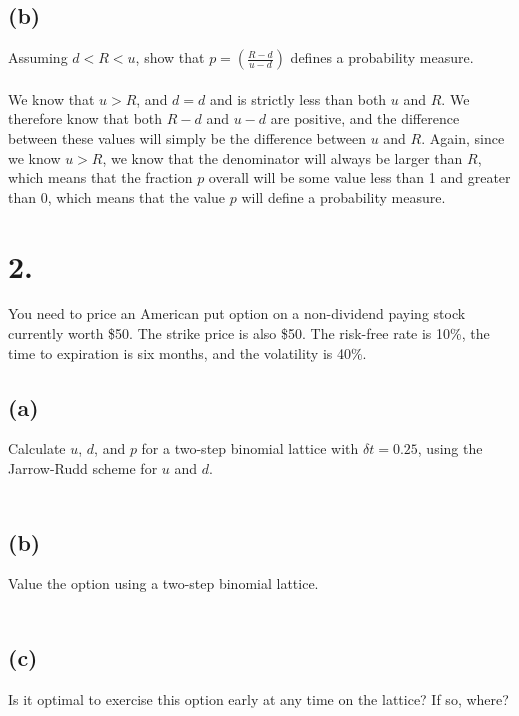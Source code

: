 \documentclass{article}
\begin{document}
{\subsection*{(b)}

Assuming $d < R < u$, show that $p = (\frac{R - d}{u - d})$ defines a probability measure. \\ \\

We know that $u > R$, and $d = d$ and is strictly less than both $u$ and $R$. We therefore know that both $R-d$ and $u-d$ are positive, and the difference between these values will simply be the difference between $u$ and $R$. Again, since we know $u > R$, we know that the denominator will always be larger than $R$, which means that the fraction $p$ overall will be some value less than 1 and greater than 0, which means that the value $p$ will define a probability measure. 

}

\section*{2.}
{\Large

You need to price an American put option on a non-dividend paying stock currently worth \$50.  The strike price is also \$50.  The risk-free rate is 10\%, the time to expiration is six months, and the volatility is 40\%.


\subsection*{(a)}

Calculate $u$, $d$, and $p$ for a two-step binomial lattice with $\delta t = 0.25$, using the Jarrow-Rudd scheme for $u$ and $d$. \\ \\

\subsection*{(b)}

Value the option using a two-step binomial lattice. \\ \\

\subsection*{(c)}

Is it optimal to exercise this option early at any time on the lattice? If so, where? \\ \\

}
\end{document}

